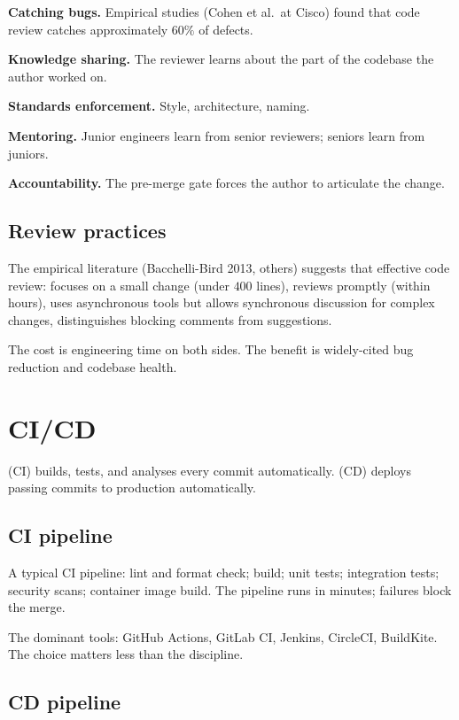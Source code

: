 \textbf{Catching bugs.} Empirical studies (Cohen et al.\ at Cisco) found that code review catches approximately $60\%$ of defects.

\textbf{Knowledge sharing.} The reviewer learns about the part of the codebase the author worked on.

\textbf{Standards enforcement.} Style, architecture, naming.

\textbf{Mentoring.} Junior engineers learn from senior reviewers; seniors learn from juniors.

\textbf{Accountability.} The pre-merge gate forces the author to articulate the change.

\subsection{Review practices}

The empirical literature (Bacchelli-Bird 2013, others) suggests that effective code review: focuses on a small change (under $400$ lines), reviews promptly (within hours), uses asynchronous tools but allows synchronous discussion for complex changes, distinguishes blocking comments from suggestions.

The cost is engineering time on both sides. The benefit is widely-cited bug reduction and codebase health.

\section{CI/CD}

 (CI) builds, tests, and analyses every commit automatically.  (CD) deploys passing commits to production automatically.

\subsection{CI pipeline}

A typical CI pipeline: lint and format check; build; unit tests; integration tests; security scans; container image build. The pipeline runs in minutes; failures block the merge.

The dominant tools: GitHub Actions, GitLab CI, Jenkins, CircleCI, BuildKite. The choice matters less than the discipline.

\subsection{CD pipeline}

